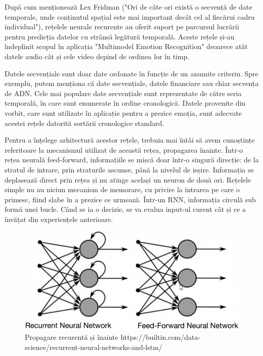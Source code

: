 \documentclass[a4paper, 12pt]{report}
\begin{document}
	După cum menționează Lex Fridman ("Ori de câte ori există o secvență de date temporale, unde conținutul spațial este mai important decât cel al fiecărui cadru individual"), rețelele neurale recurente au oferit suport pe parcursul lucrării pentru predicția datelor cu strânsă legătură temporală. Aceste rețele și-au îndeplinit scopul în aplicația "Multimodel Emotion Recognition" deoarece atât datele audio cât și cele video depind de ordinea lor în timp.

	Datele secvențiale sunt doar date ordonate în funcție de un anumite criteriu. Spre exemplu, putem menționa că date secvențiale, datele financiare sau chiar secvența de ADN. Cele mai populare date secvențiale sunt reprezentate de către seria temporală, în care sunt enumerate în ordine cronologică. Datele provenite din vorbit, care sunt utilizate în aplicație pentru a prezice emoția, sunt adecvate acestei rețele datorită sortării cronologice standard.

	Pentru a înțelege arhitectură acestor rețele, trebuia mai întâi să avem cunoștințe referitoare la mecanismul utilizat de această rețea, propagarea înainte. Într-o rețea neurală feed-forward, informațiile se mișcă doar într-o singură direcție: de la stratul de intrare, prin straturile ascunse, până la nivelul de ieșire. Informația se deplasează direct prin rețea și nu atinge același un neuron de două ori. Rețelele simple nu au niciun mecanism de memorare, cu privire la intrarea pe care o primesc, fiind slabe în a prezice ce urmează. Într-un RNN, informația circulă sub formă unei bucle. Când se ia o decizie, se va evalua input-ul curent cât și ce a învățat din experiențele anterioare.
	
	\begin{figure}[H]
		\begin{center}
			\includegraphics[scale=0.47]{images/fwd_recc.png}
		\end{center}
		\caption{Propagare recurentă și înainte\newline
			\hspace{\linewidth}https://builtin.com/data-science/recurrent-neural-networks-and-lstm/}
		\label{fig:fwd_recc}
	\end{figure} 
\end{document}
